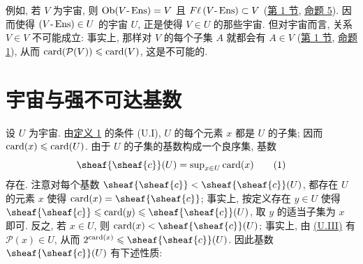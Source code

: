 例如, 若 $V$ 为宇宙, 则 $\operatorname{Ob}(V\text{-}\operatorname{Ens})=V$ 且 $F\ell\,(V\text{-}\operatorname{Ens})\subset V$ (\hyperlink{sga4.exp.I.appendix.II.sec.1}{第 1 节}, \hyperlink{sga4.exp.I.appendix.II.sec.1.proposition.5}{命题 5}). 因而使得 $(V\text{-}\operatorname{Ens})\in U$ 的宇宙 $U$, 正是使得 $V\in U$ 的那些宇宙. 但对宇宙而言, 关系 $V\in V$ 不可能成立: 事实上, 那样对 $V$ 的每个子集 $A$ 就都会有 $A\in V$ (\hyperlink{sga4.exp.I.appendix.II.sec.1}{第 1 节}, \hyperlink{sga4.exp.I.appendix.II.sec.1.proposition.1}{命题 1}), 从而 $\operatorname{card}(\mathcal{P}(V))\leqslant\operatorname{card}(V)$, 这是不可能的.



\section{宇宙与强不可达基数}%
\hypertarget{sga4.exp.I.appendix.II.sec.5}{}\pageoriginale

设 $U$ 为宇宙. 由\hyperlink{sga4.exp.I.appendix.II.sec.1.definition.1}{定义 1} 的条件 (U.I), $U$ 的每个元素 $x$ 都是 $U$ 的子集; 因而 $\operatorname{card}(x)\leqslant\operatorname{card}(U)$. 由于 $U$ 的子集的基数构成一个良序集, 基数
\hypertarget{sga4.exp.I.appendix.II.sec.5.equation.1.cardinal.c.U}{}
\begin{equation}
\sheaf{\sheaf{c}}(U)={\sup}_{x\in U}\card(x)\tag{1}
\end{equation}
存在. 注意对每个基数 $\sheaf{\sheaf{c}}<\sheaf{\sheaf{c}}(U)$, 都存在 $U$ 的元素 $x$ 使得 $\card(x)=\sheaf{\sheaf{c}}$; 事实上, 按定义存在 $y\in U$ 使得 $\sheaf{\sheaf{c}}\leq\card(y)\leq\sheaf{\sheaf{c}}(U)$, 取 $y$ 的适当子集为 $x$ 即可. 反之, 若 $x\in U$, 则 $\card(x)<\sheaf{\sheaf{c}}(U)$; 事实上, 由 \hyperlink{sga4.exp.I.appendix.II.sec.1.definition.1.condition.U.III}{(U.III)} 有 $\mathcal{P}(x)\in U$, 从而 $2^{\card(x)}\leq\sheaf{\sheaf{c}}(U)$. 因此基数 $\sheaf{\sheaf{c}}(U)$ 有下述性质:

